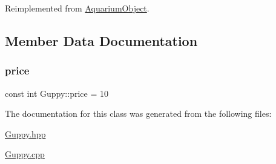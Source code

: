 Reimplemented from \mbox{\hyperlink{class_aquarium_object_a3a8269dfe29631656916cce254e77059}{Aquarium\+Object}}.



\subsection{Member Data Documentation}
\mbox{\label{class_guppy_ab0e5429cdfa8dfaafd56422fe35de0c7}} 
\subsubsection{\texorpdfstring{price}{price}}
{\footnotesize\ttfamily const int Guppy\+::price = 10\hspace{0.3cm}{\ttfamily [static]}}



The documentation for this class was generated from the following files\+:\begin{DoxyCompactItemize}
\item 
\mbox{\hyperlink{_guppy_8hpp}{Guppy.\+hpp}}\item 
\mbox{\hyperlink{_guppy_8cpp}{Guppy.\+cpp}}\end{DoxyCompactItemize}
